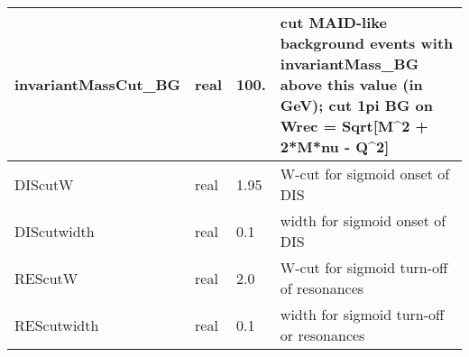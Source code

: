 \documentclass{article}
\begin{document}
\begin{longtable}{llll}
\midrule
invariantMassCut\_BG & \begin{minipage}[t]{2cm}real\end{minipage} & \begin{minipage}[t]{2cm}100.\end{minipage} & \begin{minipage}[t]{12cm}cut MAID-like background events with invariantMass\_BG above this value (in GeV); cut 1pi BG on Wrec = Sqrt[M\^{}2 + 2*M*nu - Q\^{}2]\end{minipage}\\*
\midrule
DIScutW & \begin{minipage}[t]{2cm}real\end{minipage} & \begin{minipage}[t]{2cm}1.95\end{minipage} & \begin{minipage}[t]{12cm}W-cut for sigmoid onset of DIS\end{minipage}\\*
\midrule
DIScutwidth & \begin{minipage}[t]{2cm}real\end{minipage} & \begin{minipage}[t]{2cm}0.1\end{minipage} & \begin{minipage}[t]{12cm}width for sigmoid onset of DIS\end{minipage}\\*
\midrule
REScutW & \begin{minipage}[t]{2cm}real\end{minipage} & \begin{minipage}[t]{2cm}2.0\end{minipage} & \begin{minipage}[t]{12cm}W-cut for sigmoid turn-off of resonances\end{minipage}\\*
\midrule
REScutwidth & \begin{minipage}[t]{2cm}real\end{minipage} & \begin{minipage}[t]{2cm}0.1\end{minipage} & \begin{minipage}[t]{12cm}width for sigmoid turn-off or resonances\end{minipage}\\*
\midrule

\end{longtable}
\end{document}
